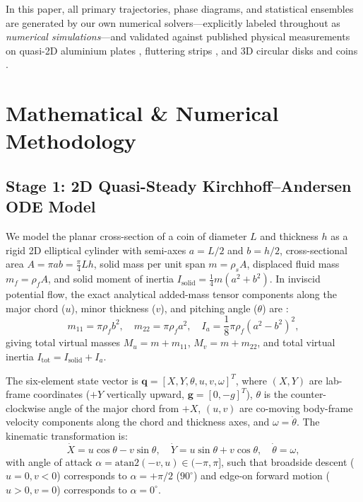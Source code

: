 \documentclass[10pt,a4paper,twocolumn]{article}
\begin{document}
In this paper, all primary trajectories, phase diagrams, and statistical ensembles are generated by our own numerical solvers---explicitly labeled throughout as \textit{numerical simulations}---and validated against published physical measurements on quasi-2D aluminium plates \cite{Andersen2005a,Andersen2005b}, fluttering strips \cite{Belmonte1998}, and 3D circular disks and coins \cite{Field1997,OndrejCloud}.

\section{Mathematical \& Numerical Methodology}

\subsection{Stage 1: 2D Quasi-Steady Kirchhoff--Andersen ODE Model}
We model the planar cross-section of a coin of diameter $L$ and thickness $h$ as a rigid 2D elliptical cylinder with semi-axes $a = L/2$ and $b = h/2$, cross-sectional area $A = \pi a b = \frac{\pi}{4}Lh$, solid mass per unit span $m = \rho_s A$, displaced fluid mass $m_f = \rho_f A$, and solid moment of inertia $I_{\mathrm{solid}} = \frac{1}{4}m(a^2 + b^2)$. In inviscid potential flow, the exact analytical added-mass tensor components along the major chord ($u$), minor thickness ($v$), and pitching angle ($\theta$) are \cite{Lamb1932,Andersen2005a}:
\begin{equation}
    m_{11} = \pi \rho_f b^2, \quad m_{22} = \pi \rho_f a^2, \quad I_a = \frac{1}{8}\pi \rho_f (a^2 - b^2)^2, \label{eq:added_mass}
\end{equation}
giving total virtual masses $M_u = m + m_{11}$, $M_v = m + m_{22}$, and total virtual inertia $I_{\mathrm{tot}} = I_{\mathrm{solid}} + I_a$.

The six-element state vector is $\mathbf{q} = [X, Y, \theta, u, v, \omega]^T$, where $(X, Y)$ are lab-frame coordinates ($+Y$ vertically upward, $\mathbf{g} = [0, -g]^T$), $\theta$ is the counter-clockwise angle of the major chord from $+X$, $(u, v)$ are co-moving body-frame velocity components along the chord and thickness axes, and $\omega = \dot{\theta}$. The kinematic transformation is:
\begin{equation}
    \dot{X} = u\cos\theta - v\sin\theta, \quad \dot{Y} = u\sin\theta + v\cos\theta, \quad \dot{\theta} = \omega, \label{eq:kinematics}
\end{equation}
with angle of attack $\alpha = \mathrm{atan2}(-v, u) \in (-\pi, \pi]$, such that broadside descent ($u = 0, v < 0$) corresponds to $\alpha = +\pi/2$ ($90^\circ$) and edge-on forward motion ($u > 0, v = 0$) corresponds to $\alpha = 0^\circ$.
\end{document}

